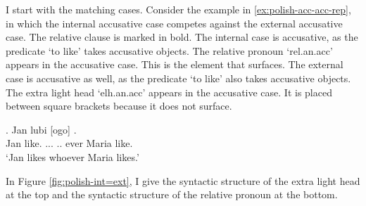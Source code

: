 I start with the matching cases.
Consider the example in \ref{ex:polish-acc-acc-rep}, in which the internal accusative case competes against the external accusative case. The relative clause is marked in bold.
The internal case is accusative, as the predicate  `to like' takes accusative objects. The relative pronoun  `\ac{rel}.\ac{an}.\ac{acc}' appears in the accusative case. This is the element that surfaces.
The external case is accusative as well, as the predicate  `to like' also takes accusative objects. The extra light head  `\ac{elh}.\ac{an}.\ac{acc}' appears in the accusative case. It is placed between square brackets because it does not surface.

\exg. Jan lubi [ogo]    .\\
 Jan like.\scsub{[acc]} ...  .. ever Maria like.\scsub{[acc]}\\
 `Jan likes whoever Maria likes.' \label{ex:polish-acc-acc-rep}

In Figure \ref{fig:polish-int=ext}, I give the syntactic structure of the extra light head at the top and the syntactic structure of the relative pronoun at the bottom.

